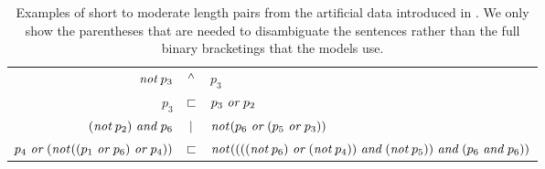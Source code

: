 \begin{table}[tp]
  \centering\small
    \begin{tabular}[t]{r c l}
      \toprule
      $\plneg p_3$        & $\natneg$ & $p_3$ \\
      $p_3$               & $\natfor$ & $p_3 \plor p_2$ \\
      $(\plneg p_2) \pland p_6  $ & $\natalt$ & $     \plneg ( p_6 \plor ( p_5 \plor p_3 ) ) $\\
 $    p_4 \plor ( \plneg ( ( p_1  \plor p_6 )  \plor p_4 ) ) $ & $ \natfor $ & $  \plneg ( ( ( ( \plneg p_6 ) \plor ( \plneg p_4 ) )  \pland ( \plneg p_5 ) )\pland ( p_6 \pland p_6 ) ) $\\      
      \bottomrule
    \end{tabular}
    \caption{Examples of short to moderate length pairs from the artificial data introduced in \protect\cite{Bowman:Potts:Manning:2014}. We only show the parentheses that are needed to disambiguate the sentences rather than the full binary bracketings that the models use.}\label{tab:plexs}
\end{table}



